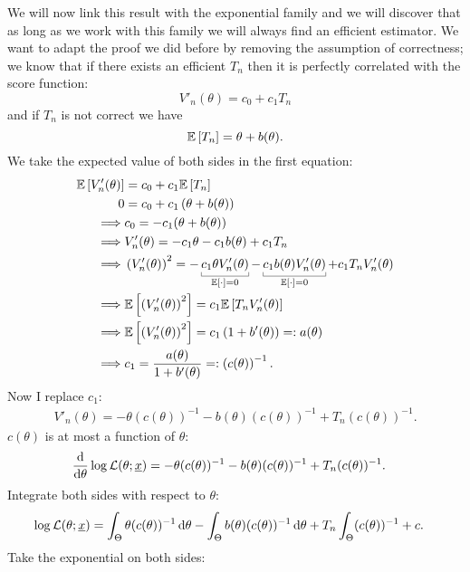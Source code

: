 \documentclass[12pt]{report}
\begin{document}
We will now link this result with the exponential family and we will discover that as long as we work with this family we will always find an efficient estimator. We want to adapt the proof we did before by removing the assumption of correctness; we know that if there exists an efficient $T_{n}$ then it is perfectly correlated with the score function:
\begin{equation*}
	V'_{n}(\theta)=c_{0}+c_{1}T_{n}
\end{equation*}
and if $T_{n}$ is not correct we have
\begin{equation*}
	\mathbb{E}\left[T_{n}\right]=\theta+b(\theta).
\end{equation*}
We take the expected value of both sides in the first equation:
\begin{align*}
	\ev{V'_{n}(\theta)}&=c_{0}+c_{1}\ev{T_{n}}\\
	0&=c_{0}+c_{1}\left(\theta+b(\theta)\right)\\
	\implies&c_{0}=-c_{1}(\theta+b(\theta))\\
	\implies&V'_{n}(\theta)=-c_{1}\theta-c_{1}b(\theta)+c_{1}T_{n}\\
	\implies&\left(V'_{n}(\theta)\right)^{2}=-\ubracketthin{c_{1}\theta V'_{n}(\theta)}_{\ev{\cdot}=0}-\ubracketthin{c_{1}b(\theta)V'_{n}(\theta)}_{\ev{\cdot}=0}+c_{1}T_{n}V'_{n}(\theta)\\
	\implies&\ev{\left(V'_{n}(\theta)\right)^{2}}=c_{1}\ev{T_{n}V'_{n}(\theta)}\\
	\implies&\ev{\left(V'_{n}(\theta)\right)^{2}}=c_{1}\left(1+b'(\theta)\right)=:a(\theta)\\
	\implies&c_{1}=\frac{a(\theta)}{1+b'(\theta)}=:\left(c(\theta)\right)^{-1}.
\end{align*}
Now I replace $c_{1}$:
\begin{align*}
	V'_{n}(\theta)=-\theta(c(\theta))^{-1}-b(\theta)(c(\theta))^{-1}+T_{n}(c(\theta))^{-1}.
\end{align*}
$c(\theta)$ is at most a function of $\theta$:
\begin{align*}
	\frac{\mathop{}\!\mathrm{d}}{\mathop{}\!\mathrm{d} \theta}\log\mathcal{L}(\theta;\underline{x})&=-\theta(c(\theta))^{-1}-b(\theta)(c(\theta))^{-1}+T_{n}(c(\theta))^{-1}.
\end{align*}
Integrate both sides with respect to $\theta$:
\begin{align*}
	\log\mathcal{L}(\theta;\underline{x})&=\int_{\Theta}\theta(c(\theta))^{-1}\mathop{}\!\mathrm{d}\theta-\int_{\Theta}b(\theta)(c(\theta))^{-1}\mathop{}\!\mathrm{d}\theta+T_{n}\int_{\Theta}(c(\theta))^{-1}+c.
\end{align*}
Take the exponential on both sides:
\end{document}
